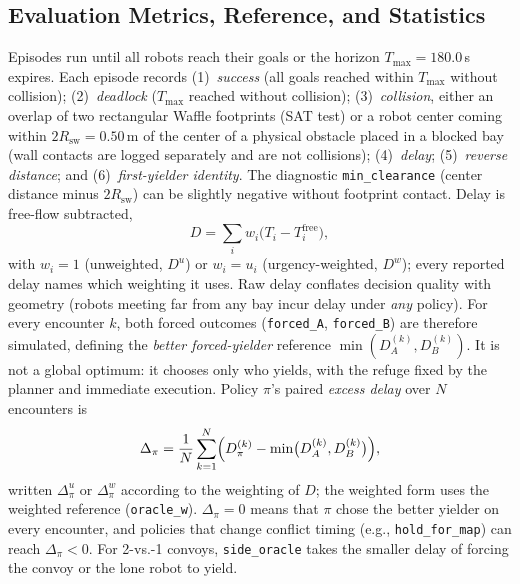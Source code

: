 \subsection{Evaluation Metrics, Reference, and Statistics}
Episodes run until all robots reach their goals or the horizon $T_{\max} = 180.0$\,s expires. Each episode records (1)~\emph{success} (all goals reached within $T_{\max}$ without collision); (2)~\emph{deadlock} ($T_{\max}$ reached without collision); (3)~\emph{collision}, either an overlap of two rectangular Waffle footprints (SAT test) or a robot center coming within $2R_{\mathrm{sw}} = 0.50$\,m of the center of a physical obstacle placed in a blocked bay (wall contacts are logged separately and are not collisions); (4)~\emph{delay}; (5)~\emph{reverse distance}; and (6)~\emph{first-yielder identity}. The diagnostic \texttt{min\_clearance} (center distance minus $2R_{\mathrm{sw}}$) can be slightly negative without footprint contact. Delay is free-flow subtracted,
\begin{equation}
D = \sum_i w_i\bigl(T_i - T_i^{\mathrm{free}}\bigr),
\label{eq:delay_total}
\end{equation}
with $w_i = 1$ (unweighted, $D^{u}$) or $w_i = u_i$ (urgency-weighted, $D^{w}$); every reported delay names which weighting it uses.
Raw delay conflates decision quality with geometry (robots meeting far from any bay incur delay under \emph{any} policy). For every encounter $k$, both forced outcomes (\texttt{forced\_A}, \texttt{forced\_B}) are therefore simulated, defining the \emph{better forced-yielder} reference $\min(D_A^{(k)}, D_B^{(k)})$. It is not a global optimum: it chooses only who yields, with the refuge fixed by the planner and immediate execution. Policy $\pi$'s paired \emph{excess delay} over $N$ encounters is
\begin{equation}
\Delta_\pi = \frac{1}{N}\sum_{k=1}^{N}\Bigl(D_\pi^{(k)} - \min\bigl(D_A^{(k)}, D_B^{(k)}\bigr)\Bigr),
\label{eq:excess}
\end{equation}
written $\Delta^{u}_\pi$ or $\Delta^{w}_\pi$ according to the weighting of $D$; the weighted form uses the weighted reference (\texttt{oracle\_w}). $\Delta_\pi = 0$ means that $\pi$ chose the better yielder on every encounter, and policies that change conflict timing (e.g., \texttt{hold\_for\_map}) can reach $\Delta_\pi < 0$. For 2-vs.-1 convoys, \texttt{side\_oracle} takes the smaller delay of forcing the convoy or the lone robot to yield.
